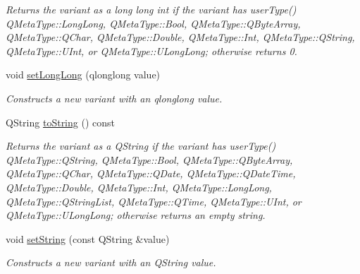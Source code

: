 \begin{DoxyCompactItemize}
\begin{DoxyCompactList}\small\item\em Returns the variant as a long long int if the variant has user\+Type() Q\+Meta\+Type\+::\+Long\+Long, Q\+Meta\+Type\+::\+Bool, Q\+Meta\+Type\+::\+Q\+Byte\+Array, Q\+Meta\+Type\+::\+Q\+Char, Q\+Meta\+Type\+::\+Double, Q\+Meta\+Type\+::\+Int, Q\+Meta\+Type\+::\+Q\+String, Q\+Meta\+Type\+::\+U\+Int, or Q\+Meta\+Type\+::\+U\+Long\+Long; otherwise returns 0. \end{DoxyCompactList}\item 
\mbox{\label{class_variant_a71259193b1023a8ef4761cc92b4c96b4}} 
void \mbox{\hyperlink{class_variant_a71259193b1023a8ef4761cc92b4c96b4}{set\+Long\+Long}} (qlonglong value)
\begin{DoxyCompactList}\small\item\em Constructs a new variant with an qlonglong value. \end{DoxyCompactList}\item 
\mbox{\label{class_variant_a72d36925a5a47a1138a339cd4c4d3feb}} 
Q\+String \mbox{\hyperlink{class_variant_a72d36925a5a47a1138a339cd4c4d3feb}{to\+String}} () const
\begin{DoxyCompactList}\small\item\em Returns the variant as a Q\+String if the variant has user\+Type() Q\+Meta\+Type\+::\+Q\+String, Q\+Meta\+Type\+::\+Bool, Q\+Meta\+Type\+::\+Q\+Byte\+Array, Q\+Meta\+Type\+::\+Q\+Char, Q\+Meta\+Type\+::\+Q\+Date, Q\+Meta\+Type\+::\+Q\+Date\+Time, Q\+Meta\+Type\+::\+Double, Q\+Meta\+Type\+::\+Int, Q\+Meta\+Type\+::\+Long\+Long, Q\+Meta\+Type\+::\+Q\+String\+List, Q\+Meta\+Type\+::\+Q\+Time, Q\+Meta\+Type\+::\+U\+Int, or Q\+Meta\+Type\+::\+U\+Long\+Long; otherwise returns an empty string. \end{DoxyCompactList}\item 
\mbox{\label{class_variant_a16fb274754b40796aa8341456c53d53c}} 
void \mbox{\hyperlink{class_variant_a16fb274754b40796aa8341456c53d53c}{set\+String}} (const Q\+String \&value)
\begin{DoxyCompactList}\small\item\em Constructs a new variant with an Q\+String value. \end{DoxyCompactList}\end{DoxyCompactItemize}
